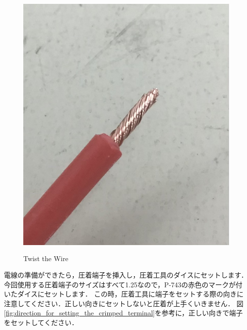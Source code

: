\documentclass[{../../master}]{subfiles}
\begin{document}
\begin{figure}[ht]
  \centering
  \includegraphics[height=50truemm]{images/twist_the_wire.jpg}
  \label{fig:twist_the_wire}
  \caption{Twist the Wire}
\end{figure}

電線の準備ができたら，圧着端子を挿入し，圧着工具のダイスにセットします．
今回使用する圧着端子のサイズはすべて1.25なので，P-743の赤色のマークが付いたダイスにセットします．
この時，圧着工具に端子をセットする際の向きに注意してください．正しい向きにセットしないと圧着が上手くいきません．
図\ref{fig:direction_for_setting_the_crimped_terminal}を参考に，正しい向きで端子をセットしてください．
\end{document}

